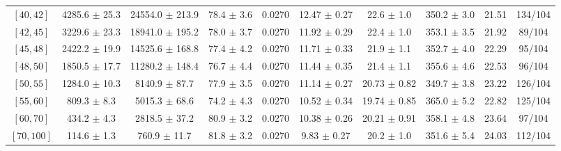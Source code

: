 \begin{tabular}{c||c|c|c|c|c|c|c||c|c}
$[40, 42]$ & 4285.6 $\pm$ 25.3 & 24554.0 $\pm$ 213.9 & 78.4 $\pm$ 3.6 & 0.0270 & 12.47 $\pm$ 0.27 & 22.6 $\pm$ 1.0 & 350.2 $\pm$ 3.0 & 21.51 & 134/104\\
$[42, 45]$ & 3229.6 $\pm$ 23.3 & 18941.0 $\pm$ 195.2 & 78.0 $\pm$ 3.7 & 0.0270 & 11.92 $\pm$ 0.29 & 22.4 $\pm$ 1.0 & 353.1 $\pm$ 3.5 & 21.92 & 89/104\\
$[45, 48]$ & 2422.2 $\pm$ 19.9 & 14525.6 $\pm$ 168.8 & 77.4 $\pm$ 4.2 & 0.0270 & 11.71 $\pm$ 0.33 & 21.9 $\pm$ 1.1 & 352.7 $\pm$ 4.0 & 22.29 & 95/104\\
$[48, 50]$ & 1850.5 $\pm$ 17.7 & 11280.2 $\pm$ 148.4 & 76.7 $\pm$ 4.4 & 0.0270 & 11.44 $\pm$ 0.35 & 21.4 $\pm$ 1.1 & 355.6 $\pm$ 4.6 & 22.53 & 96/104\\
$[50, 55]$ & 1284.0 $\pm$ 10.3 & 8140.9 $\pm$ 87.7 & 77.9 $\pm$ 3.5 & 0.0270 & 11.14 $\pm$ 0.27 & 20.73 $\pm$ 0.82 & 349.7 $\pm$ 3.8 & 23.22 & 126/104\\
$[55, 60]$ & 809.3 $\pm$ 8.3 & 5015.3 $\pm$ 68.6 & 74.2 $\pm$ 4.3 & 0.0270 & 10.52 $\pm$ 0.34 & 19.74 $\pm$ 0.85 & 365.0 $\pm$ 5.2 & 22.82 & 125/104\\
$[60, 70]$ & 434.2 $\pm$ 4.3 & 2818.5 $\pm$ 37.2 & 80.9 $\pm$ 3.2 & 0.0270 & 10.38 $\pm$ 0.26 & 20.21 $\pm$ 0.91 & 358.1 $\pm$ 4.8 & 23.64 & 97/104\\
$[70, 100]$ & 114.6 $\pm$ 1.3 & 760.9 $\pm$ 11.7 & 81.8 $\pm$ 3.2 & 0.0270 & 9.83 $\pm$ 0.27 & 20.2 $\pm$ 1.0 & 351.6 $\pm$ 5.4 & 24.03 & 112/104\\
\end{tabular}
